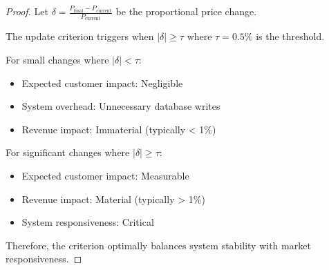 \documentclass[12pt,a4paper,oneside]{report}
\begin{document}
\begin{proof}
Let $\delta = \frac{P_{\text{final}} - P_{\text{current}}}{P_{\text{current}}}$ be the proportional price change.

The update criterion triggers when $|\delta| \geq \tau$ where $\tau = 0.5\%$ is the threshold.

For small changes where $|\delta| < \tau$:
\begin{itemize}
    \item Expected customer impact: Negligible
    \item System overhead: Unnecessary database writes
    \item Revenue impact: Immaterial (typically < 1\%)
\end{itemize}

For significant changes where $|\delta| \geq \tau$:
\begin{itemize}
    \item Expected customer impact: Measurable
    \item Revenue impact: Material (typically > 1\%)
    \item System responsiveness: Critical
\end{itemize}

Therefore, the criterion optimally balances system stability with market responsiveness.
\end{proof}
\end{document}
